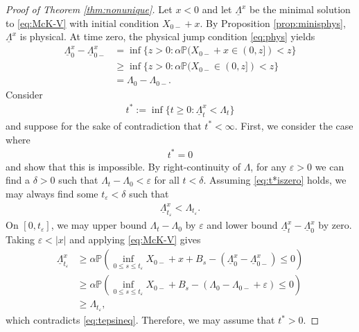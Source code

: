 \documentclass[12pt]{amsart}
\newcommand{\lb}{\left}
\newcommand{\rb}{\right}
\newcommand{\ubar}{\underline}
\newcommand{\veps}{\varepsilon}
\newcommand{\bP}{\mathbb{P}}
\theoremstyle{plain}
\theoremstyle{definition}
\begin{document}
\begin{proof}[Proof of Theorem \ref{thm:nonunique}]
Let $x<0$ and let $\ubar{\Lambda}^x$ be the minimal solution to \eqref{eq:McK-V} with initial condition $X_{0-}+x$.
By Proposition \ref{prop:minisphys}, $\ubar{\Lambda}^x$ is physical. At time zero, the physical jump condition \eqref{eq:phys} yields
\begin{equation}
\begin{split}
\ubar{\Lambda}^x_0-\ubar{\Lambda}^x_{0-}&=\inf\{z>0:\alpha\bP(X_{0-}+x\in(0,z])<z\}\\
&\ge \inf\{z>0:\alpha\bP(X_{0-}\in(0,z])<z\}\\
&=\Lambda_{0}-\Lambda_{0-}.
\end{split}
\end{equation}
Consider 
\begin{align}
t^*:=\inf\{t\ge0:\ubar{\Lambda}^x_t<\Lambda_t\}
\end{align}
and suppose for the sake of contradiction that $t^*<\infty$.
First, we consider the case where 
\begin{align}\label{eq:t*iszero}
t^*=0
\end{align}
and show that this is impossible. By right-continuity of $\Lambda$, for any $\veps>0$ we can find a $\delta>0$ such that $\Lambda_t-\Lambda_0<\veps$ for all $t<\delta$. Assuming \eqref{eq:t*iszero} holds, we may always find some $t_\veps<\delta$ such that
\begin{align}\label{eq:tepsineq}
\ubar{\Lambda}^x_{t_\veps}<\Lambda_{t_\veps}.
\end{align}
On $[0,t_\veps]$, we may upper bound $\Lambda_t-\Lambda_0$ by $\veps$ and lower bound $\ubar{\Lambda}^x_t-\ubar{\Lambda}^x_0$ by zero. Taking $\veps<|x|$ and applying \eqref{eq:McK-V} gives
\begin{equation}
\begin{split}
\ubar{\Lambda}^x_{t_\veps}&\ge \alpha\bP \lb(\inf_{0\le s\le t_\veps} X_{0-}+x+B_s-(\ubar{\Lambda}^x_0-\ubar{\Lambda}^x_{0-})\le 0\rb)\\
&\ge \alpha\bP \lb(\inf_{0\le s\le t_\veps} X_{0-}+B_s-(\Lambda_0-\Lambda_{0-}+\veps)\le 0\rb)\\
&\ge \Lambda_{t_\veps},
\end{split}
\end{equation}
which contradicts \eqref{eq:tepsineq}. Therefore, we may assume that $t^*>0$.

\medskip


\end{proof}
\end{document}
